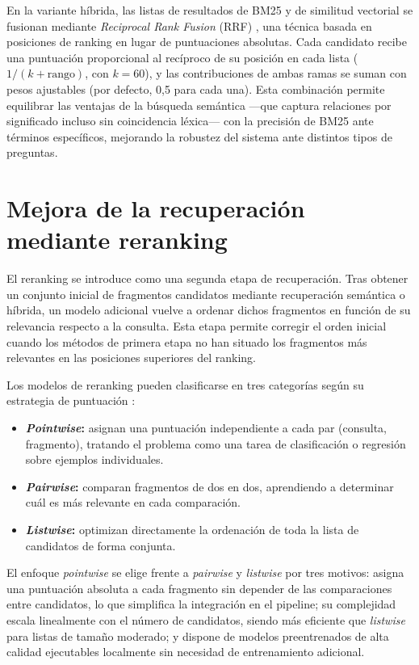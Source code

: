 En la variante híbrida, las listas de resultados de BM25 y de similitud vectorial se fusionan mediante \textit{Reciprocal Rank Fusion} (RRF) \cite{cormack2009reciprocal}, una técnica basada en posiciones de ranking en lugar de puntuaciones absolutas.
Cada candidato recibe una puntuación proporcional al recíproco de su posición en cada lista ($1/(k + \text{rango})$, con $k=60$), y las contribuciones de ambas ramas se suman con pesos ajustables (por defecto, 0,5 para cada una).
Esta combinación permite equilibrar las ventajas de la búsqueda semántica —que captura relaciones por significado incluso sin coincidencia léxica— con la precisión de BM25 ante términos específicos, mejorando la robustez del sistema ante distintos tipos de preguntas.

\section{Mejora de la recuperación mediante reranking}\label{sec:reranking}

El reranking se introduce como una segunda etapa de recuperación.
Tras obtener un conjunto inicial de fragmentos candidatos mediante recuperación semántica o híbrida, un modelo adicional vuelve a ordenar dichos fragmentos en función de su relevancia respecto a la consulta.
Esta etapa permite corregir el orden inicial cuando los métodos de primera etapa no han situado los fragmentos más relevantes en las posiciones superiores del ranking.

Los modelos de reranking pueden clasificarse en tres categorías según su estrategia de puntuación \cite{liu2009learning}:

\begin{itemize}
    \item \textbf{\textit{Pointwise}:} asignan una puntuación independiente a cada par (consulta, fragmento), tratando el problema como una tarea de clasificación o regresión sobre ejemplos individuales.
    \item \textbf{\textit{Pairwise}:} comparan fragmentos de dos en dos, aprendiendo a determinar cuál es más relevante en cada comparación.
    \item \textbf{\textit{Listwise}:} optimizan directamente la ordenación de toda la lista de candidatos de forma conjunta.
\end{itemize}

El enfoque \textit{pointwise} se elige frente a \textit{pairwise} y \textit{listwise} por tres motivos: asigna una puntuación absoluta a cada fragmento sin depender de las comparaciones entre candidatos, lo que simplifica la integración en el pipeline; su complejidad escala linealmente con el número de candidatos, siendo más eficiente que \textit{listwise} para listas de tamaño moderado; y dispone de modelos preentrenados de alta calidad ejecutables localmente sin necesidad de entrenamiento adicional.

